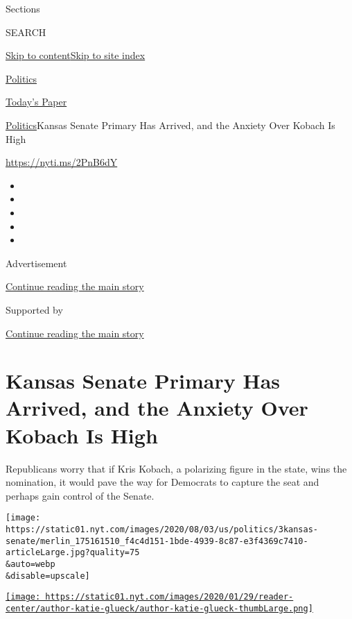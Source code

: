 Sections

SEARCH

\protect\hyperlink{site-content}{Skip to
content}\protect\hyperlink{site-index}{Skip to site index}

\href{https://www.nytimes.com/section/politics}{Politics}

\href{https://myaccount.nytimes.com/auth/login?response_type=cookie\&client_id=vi}{}

\href{https://www.nytimes.com/section/todayspaper}{Today's Paper}

\href{/section/politics}{Politics}\textbar{}Kansas Senate Primary Has
Arrived, and the Anxiety Over Kobach Is High

\url{https://nyti.ms/2PnB6dY}

\begin{itemize}
\item
\item
\item
\item
\item
\end{itemize}

Advertisement

\protect\hyperlink{after-top}{Continue reading the main story}

Supported by

\protect\hyperlink{after-sponsor}{Continue reading the main story}

\hypertarget{kansas-senate-primary-has-arrived-and-the-anxiety-over-kobach-is-high}{%
\section{Kansas Senate Primary Has Arrived, and the Anxiety Over Kobach
Is
High}\label{kansas-senate-primary-has-arrived-and-the-anxiety-over-kobach-is-high}}

Republicans worry that if Kris Kobach, a polarizing figure in the state,
wins the nomination, it would pave the way for Democrats to capture the
seat and perhaps gain control of the Senate.

\texttt{[image: https://static01.nyt.com/images/2020/08/03/us/politics/3kansas-senate/merlin\_175161510\_f4c4d151-1bde-4939-8c87-e3f4369c7410-articleLarge.jpg?quality=75\\\&auto=webp\\\&disable=upscale]}

\href{https://www.nytimes.com/by/katie-glueck}{\texttt{[image: https://static01.nyt.com/images/2020/01/29/reader-center/author-katie-glueck/author-katie-glueck-thumbLarge.png]}}

